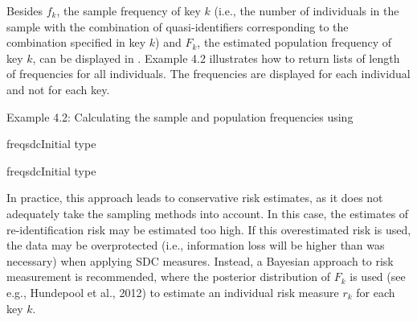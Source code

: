 \documentclass[letterpaper,10pt,english]{sphinxmanual}
\begin{document}
Besides \(f_{k}\), the sample frequency of key
\(k\) (i.e., the number of individuals in the sample with
the combination of quasi-identifiers corresponding to the combination
specified in key \(k\)) and \(F_{k}\), the estimated population
frequency of key \(k\), can be displayed in . Example 4.2
illustrates how to return lists of length  of frequencies for all
individuals. The frequencies are displayed for each individual and not
for each key.

Example 4.2: Calculating the sample and population frequencies using

%
\begin{sphinxVerbatim}[commandchars=\\\{\}]
freqsdcInitial type  
         

freqsdcInitial type  
         
\end{sphinxVerbatim}

In practice, this approach leads to conservative risk estimates, as it
does not adequately take the sampling methods into account. In this
case, the estimates of re-identification risk may be estimated too high.
If this overestimated risk is used, the data may be overprotected (i.e.,
information loss will be higher than was necessary) when applying SDC
measures. Instead, a Bayesian approach to risk measurement is
recommended, where the posterior distribution of \(F_{k}\) is used
(see e.g., Hundepool et al., 2012) to estimate an individual risk
measure \(r_{k}\) for each key \(k\).
\end{document}
